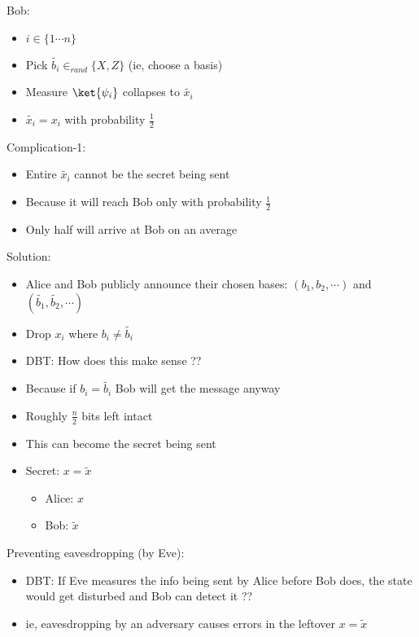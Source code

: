 \documentclass[12pt]{article}
\begin{document}
Bob: 
\begin{itemize}
\item $i \in \{1 \cdots n\}$
\item Pick $\tilde{b_i} \in_{rand} \{X, Z\}$ (ie, choose a basis)
\item Measure $\ket{\psi_i}$ collapses to $\tilde{x_i}$
\item $\tilde{x_i} = x_i$ with probability $\frac{1}{2}$
\end{itemize}

Complication-1:
\begin{itemize}
\item Entire $\tilde{x_i}$ cannot be the secret being sent
\item Because it will reach Bob only with probability $\frac{1}{2}$
\item Only half will arrive at Bob on an average
\end{itemize}

Solution:
\begin{itemize}
\item Alice and Bob publicly announce their chosen bases:
  $(b_1, b_2, \cdots)$ and $(\tilde{b_1}, \tilde{b_2}, \cdots)$
\item Drop $x_i$ where $b_i \neq \tilde{b_i}$
\item DBT: How does this make sense ??
\item Because if $b_i = \tilde{b_i}$ Bob will get the message anyway
\item Roughly $\frac{n}{2}$ bits left intact
\item This can become the secret being sent
\item Secret: $x=\tilde{x}$
  \begin{itemize}
  \item Alice: $x$
  \item Bob: $\tilde{x}$
  \end{itemize}
\end{itemize}

Preventing eavesdropping (by Eve):
\begin{itemize}
\item DBT: If Eve measures the info being sent by Alice before Bob does,
  the state would get disturbed and Bob can detect it ??
\item ie, eavesdropping by an adversary causes errors in the leftover
  $x = \tilde{x}$
\end{itemize}
\end{document}

